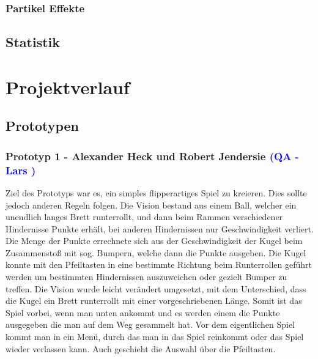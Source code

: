 \documentclass[12pt]{article}
\begin{document}
\vspace{1cm}
\subsubsection{Partikel Effekte}

\vspace{2cm}
\subsection{Statistik}


\newpage
\section{Projektverlauf}

\vspace{2cm}
\subsection{Prototypen}

\vspace{1cm}
\subsubsection{Prototyp 1 - Alexander Heck und Robert Jendersie \textcolor{blue}{(QA - Lars )}}

Ziel des Prototyps war es, ein simples flipperartiges Spiel zu kreieren. Dies sollte jedoch anderen Regeln folgen. Die Vision
bestand aus einem Ball, welcher ein unendlich langes Brett runterrollt, und dann beim Rammen verschiedener Hindernisse
Punkte erhält, bei anderen Hindernissen nur Geschwindigkeit verliert. Die Menge der Punkte errechnete sich aus der Geschwindigkeit
der Kugel beim Zusammenstoß mit sog. Bumpern, welche dann die Punkte ausgeben. Die Kugel konnte mit den Pfeiltasten
in eine bestimmte Richtung beim Runterrollen geführt werden um bestimmten Hindernissen auszuweichen oder gezielt Bumper
zu treffen. Die Vision wurde leicht verändert umgesetzt, mit dem Unterschied, dass die Kugel ein Brett runterrollt mit einer
vorgeschriebenen Länge. Somit ist das Spiel vorbei, wenn man unten ankommt und es werden einem die Punkte ausgegeben
die man auf dem Weg gesammelt hat. Vor dem eigentlichen Spiel kommt man in ein Menü, durch das man in das Spiel
reinkommt oder das Spiel wieder verlassen kann. Auch geschieht die Auswahl über die Pfeiltasten.\newline\newline
\end{document}
